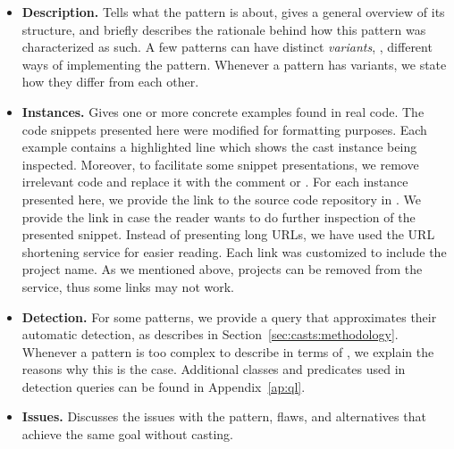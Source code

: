\begin{itemize}

\item\textbf{Description.}
Tells what the pattern is about, gives a general overview of its structure, and
briefly describes the rationale behind how this pattern was characterized as such.
A few patterns can have distinct \emph{variants}, \ie,
different ways of implementing the pattern.
Whenever a pattern has variants,
we state how they differ from each other.

\item\textbf{Instances.}
Gives one or more concrete examples found in real code.
The code snippets presented here were modified for formatting purposes.
Each example contains a highlighted line which shows the cast instance being inspected.
Moreover, to facilitate some snippet presentations,
we remove irrelevant code and replace it with the comment
\code{// [...]} or \code{/* [...] */}.
For each instance presented here,
we provide the link to the source code repository in \lgtm{}.
We provide the link in case the reader wants to do further inspection of the presented snippet.
Instead of presenting long \lgtm{} URLs,
we have used the URL shortening service
\href{https://bitly.com/}{\bitly} for easier reading.
Each \bitly{} link was customized to include the project name.
As we mentioned above, projects can be removed from the \lgtm{} service,
thus some links may not work.

\item\textbf{Detection.}
For some patterns,
we provide a \ql{} query that approximates their automatic detection,
as describes in Section~\ref{sec:casts:methodology}.
Whenever a pattern is too complex to describe in terms of \ql{},
we explain the reasons why this is the case.
Additional \ql{} classes and predicates used in detection queries can be found in Appendix~\ref{ap:ql}.

\item\textbf{Issues.}
Discusses the issues with the pattern, flaws, and alternatives that achieve the same goal without casting.

\end{itemize}

